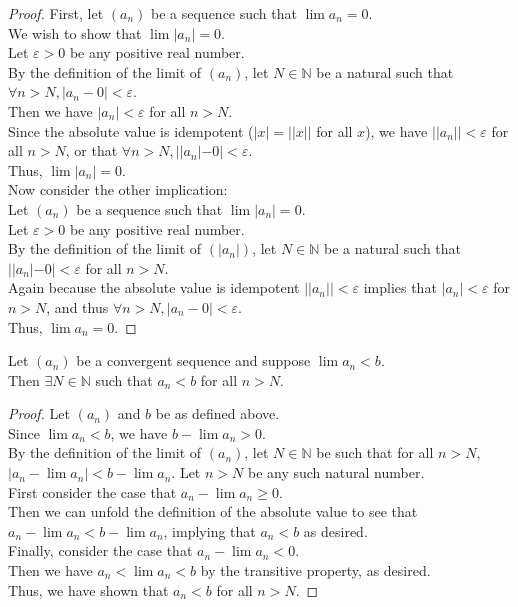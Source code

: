 \documentclass{article}
\newenvironment{theorem}[1]{\renewcommand\theinnercustomthm{#1}\innercustomthm}
  {\endinnercustomthm}
\begin{document}
\begin{proof}
First, let $(a_n)$ be a sequence such that $\lim a_n = 0$. \\
We wish to show that $\lim |a_n| = 0$. \\
Let $\varepsilon > 0$ be any positive real number. \\
By the definition of the limit of $(a_n)$, let $N\in\mathbb N$ be a natural such that $\forall n>N, |a_n - 0|<\varepsilon$. \\
Then we have $|a_n| < \varepsilon$ for all $n > N$. \\
Since the absolute value is idempotent ($|x| =||x||$ for all $x$), we have $||a_n|| < \varepsilon$ for all $n > N$, or that $\forall n>N, ||a_n| - 0| < \varepsilon$. \\
Thus, $\lim |a_n| = 0$.  \\

Now consider the other implication: \\
Let $(a_n)$ be a sequence such that $\lim |a_n| = 0$. \\
Let $\varepsilon > 0$ be any positive real number. \\
By the definition of the limit of $(|a_n|)$, let $N \in \mathbb N$ be a natural such that $||a_n| - 0| < \varepsilon$ for all $n > N$. \\
Again because the absolute value is idempotent $||a_n|| < \varepsilon$ implies that $|a_n| < \varepsilon$ for $n > N$, and thus $\forall n>N, |a_n - 0| <\varepsilon$. \\
Thus, $\lim a_n = 0$.
\end{proof}

\begin{theorem}5
    Let $(a_n)$ be a convergent sequence and suppose $\lim a_n < b$. \\
    Then $\exists N \in \mathbb N$ such that $a_n < b$ for all $n > N$.
\end{theorem}
\begin{proof}
    Let $(a_n)$ and $b$ be as defined above. \\
    Since $\lim a_n < b$, we have $b - \lim a_n > 0$. \\
    By the definition of the limit of $(a_n)$, let $N \in \mathbb N$ be such that for all $n > N$, $|a_n - \lim a_n| < b - \lim a_n$. Let $n > N$ be any such natural number. \\
    First consider the case that $a_n - \lim a_n \ge 0$. \\
    Then we can unfold the definition of the absolute value to see that $a_n - \lim a_n < b - \lim a_n$, implying that $a_n < b$ as desired. \\
    Finally, consider the case that $a_n - \lim a_n < 0$. \\
    Then we have $a_n < \lim a_n < b$ by the transitive property, as desired. \\
    Thus, we have shown that $a_n < b$ for all $n > N$.
\end{proof}
\end{document}

